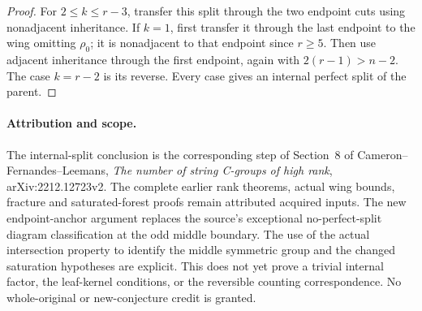 \documentclass[11pt,a4paper]{article}
\begin{document}
\begin{proof}
For $2\le k\le r-3$, transfer this split through the two endpoint
cuts using nonadjacent inheritance. If $k=1$, first transfer it
through the last endpoint to the wing omitting $\rho_0$;
it is nonadjacent to that endpoint since $r\ge5$.
Then use adjacent inheritance through the first endpoint, again with
$2(r-1)>n-2$. The case $k=r-2$ is its reverse. Every case gives
an internal perfect split of the parent.
\end{proof}

\paragraph{Attribution and scope.}
The internal-split conclusion is the corresponding step of Section~8
of Cameron--Fernandes--Leemans, \emph{The number of string C-groups
of high rank}, arXiv:2212.12723v2. The complete earlier rank theorems,
actual wing bounds, fracture and saturated-forest proofs remain
attributed acquired inputs. The new endpoint-anchor argument replaces
the source's exceptional no-perfect-split diagram classification at the
odd middle boundary. The use of the actual intersection property to
identify the middle symmetric group and the changed saturation
hypotheses are explicit. This does not yet prove a trivial internal
factor, the leaf-kernel conditions, or the reversible counting
correspondence. No whole-original or new-conjecture credit is granted.
\end{document}
